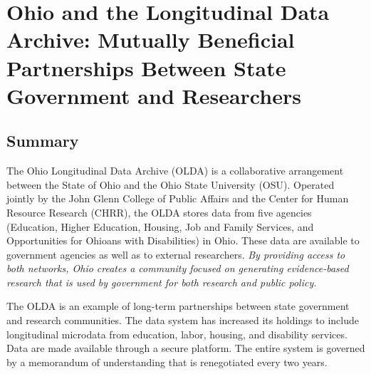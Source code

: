 \hypertarget{olda}{%
\chapter{Ohio and the Longitudinal Data Archive: Mutually Beneficial Partnerships Between State Government and Researchers}\label{olda}}

\hrulefill

\hypertarget{summary-2}{%
\section{Summary}\label{summary-2}}

The Ohio Longitudinal Data Archive (OLDA) is a collaborative arrangement between the State of Ohio and the Ohio State University (OSU). Operated jointly by the John Glenn College of Public Affairs and the Center for Human Resource Research (CHRR), the OLDA stores data from five agencies (Education, Higher Education, Housing, Job and Family Services, and Opportunities for Ohioans with Disabilities) in Ohio. These data are available to government agencies as well as to external researchers. \emph{By providing access to both networks, Ohio creates a community focused on generating evidence-based research that is {used} by government for both research and public policy.}

The OLDA is an example of long-term partnerships between state government and research communities. The data system has increased its holdings to include longitudinal microdata from education, labor, housing, and disability services. Data are made available through a secure platform. The entire system is governed by a memorandum of understanding that is renegotiated every two years.

